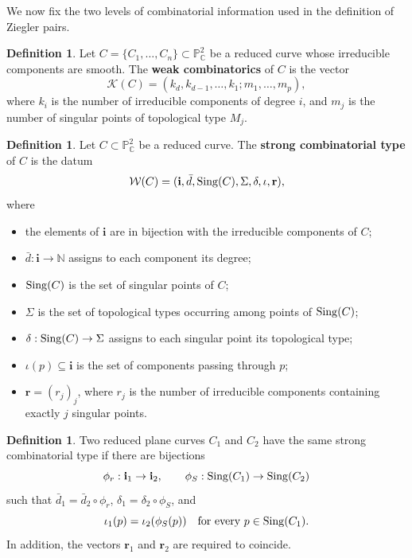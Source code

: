 \documentclass[11pt]{article}
\theoremstyle{plain}
\theoremstyle{definition}
\newtheorem{definition}[thm]{Definition}
\begin{document}
We now fix the two levels of combinatorial information used in the definition of Ziegler pairs.

\begin{definition}\label{def:WeakComb}
Let $C=\{C_1,\ldots,C_n\}\subset\mathbb P^2_{\mathbb C}$ be a reduced curve whose irreducible components are smooth. The \textbf{weak combinatorics} of $C$ is the vector
\[
\mathcal K(C)=(k_d,k_{d-1},\ldots,k_1;m_1,\ldots,m_p),
\]
where $k_i$ is the number of irreducible components of degree $i$, and $m_j$ is the number of singular points of topological type $M_j$.
\end{definition}

\begin{definition} \label{def:StrongComb}
Let $C\subset\mathbb P^2_{\mathbb C}$ be a reduced curve. The \textbf{strong combinatorial type} of $C$ is the datum
\[
\mathcal W(C)=(\mathbf i,\bar d,{\rm Sing}(C),\Sigma,\delta,\iota,\mathbf r),
\]
where
\begin{itemize}
\item the elements of $\mathbf i$ are in bijection with the irreducible components of $C$;
\item $\bar d:\mathbf i\rightarrow\mathbb N$ assigns to each component its degree;
\item ${\rm Sing}(C)$ is the set of singular points of $C$;
\item $\Sigma$ is the set of topological types occurring among points of ${\rm Sing}(C)$;
\item $\delta:{\rm Sing}(C)\rightarrow\Sigma$ assigns to each singular point its topological type;
\item $\iota(p)\subseteq\mathbf i$ is the set of components passing through $p$;
\item $\mathbf r=(r_j)_j$, where $r_j$ is the number of irreducible components containing exactly $j$ singular points.
\end{itemize}
\end{definition}

\begin{definition}
\label{iso}
Two reduced plane curves $C_1$ and $C_2$ have the same strong combinatorial type if there are bijections
\[
\phi_r:\mathbf i_1\rightarrow\mathbf i_2,
\qquad
\phi_S:{\rm Sing}(C_1)\rightarrow{\rm Sing}(C_2)
\]
such that $\bar d_1=\bar d_2\circ\phi_r$, $\delta_1=\delta_2\circ\phi_S$, and
\[
\iota_1(p)=\iota_2(\phi_S(p))
\quad\text{for every }p\in{\rm Sing}(C_1).
\]
In addition, the vectors $\mathbf r_1$ and $\mathbf r_2$ are required to coincide.
\end{definition}
\end{document}
